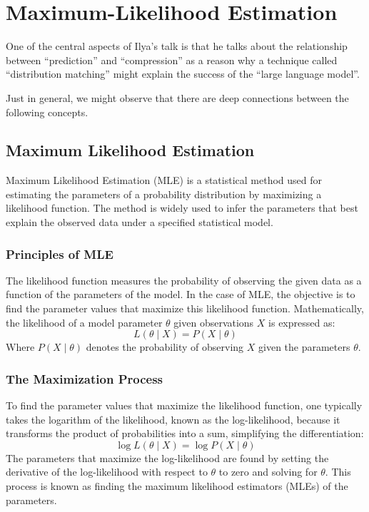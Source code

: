 \section{Maximum-Likelihood Estimation}

One of the central aspects of Ilya's talk is that he talks about the relationship between ``prediction'' and ``compression'' as a reason why a technique called ``distribution matching'' might explain the success of the ``large language model''.

Just in general, we might observe that there are deep connections between the following concepts.

\subsection{Maximum Likelihood Estimation}

Maximum Likelihood Estimation (MLE) is a statistical method used for estimating the parameters of a probability distribution by maximizing a likelihood function. The method is widely used to infer the parameters that best explain the observed data under a specified statistical model.

\subsubsection{Principles of MLE}
The likelihood function measures the probability of observing the given data as a function of the parameters of the model. In the case of MLE, the objective is to find the parameter values that maximize this likelihood function. Mathematically, the likelihood of a model parameter \( \theta \) given observations \( X \) is expressed as:
\[
L(\theta \mid X) = P(X \mid \theta)
\]
Where \( P(X \mid \theta) \) denotes the probability of observing \( X \) given the parameters \( \theta \).

\subsubsection{The Maximization Process}
To find the parameter values that maximize the likelihood function, one typically takes the logarithm of the likelihood, known as the log-likelihood, because it transforms the product of probabilities into a sum, simplifying the differentiation:
\[
\log L(\theta \mid X) = \log P(X \mid \theta)
\]
The parameters that maximize the log-likelihood are found by setting the derivative of the log-likelihood with respect to \( \theta \) to zero and solving for \( \theta \). This process is known as finding the maximum likelihood estimators (MLEs) of the parameters.

